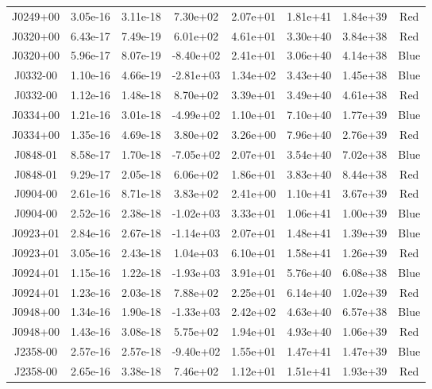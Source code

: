 \begin{table}
\begin{tabular}{cccccccc}
J0249+00 & 3.05e-16 & 3.11e-18 & 7.30e+02 & 2.07e+01 & 1.81e+41 & 1.84e+39 & Red \\
J0320+00 & 6.43e-17 & 7.49e-19 & 6.01e+02 & 4.61e+01 & 3.30e+40 & 3.84e+38 & Red \\
J0320+00 & 5.96e-17 & 8.07e-19 & -8.40e+02 & 2.41e+01 & 3.06e+40 & 4.14e+38 & Blue \\
J0332-00 & 1.10e-16 & 4.66e-19 & -2.81e+03 & 1.34e+02 & 3.43e+40 & 1.45e+38 & Blue \\
J0332-00 & 1.12e-16 & 1.48e-18 & 8.70e+02 & 3.39e+01 & 3.49e+40 & 4.61e+38 & Red \\
J0334+00 & 1.21e-16 & 3.01e-18 & -4.99e+02 & 1.10e+01 & 7.10e+40 & 1.77e+39 & Blue \\
J0334+00 & 1.35e-16 & 4.69e-18 & 3.80e+02 & 3.26e+00 & 7.96e+40 & 2.76e+39 & Red \\
J0848-01 & 8.58e-17 & 1.70e-18 & -7.05e+02 & 2.07e+01 & 3.54e+40 & 7.02e+38 & Blue \\
J0848-01 & 9.29e-17 & 2.05e-18 & 6.06e+02 & 1.86e+01 & 3.83e+40 & 8.44e+38 & Red \\
J0904-00 & 2.61e-16 & 8.71e-18 & 3.83e+02 & 2.41e+00 & 1.10e+41 & 3.67e+39 & Red \\
J0904-00 & 2.52e-16 & 2.38e-18 & -1.02e+03 & 3.33e+01 & 1.06e+41 & 1.00e+39 & Blue \\
J0923+01 & 2.84e-16 & 2.67e-18 & -1.14e+03 & 2.07e+01 & 1.48e+41 & 1.39e+39 & Blue \\
J0923+01 & 3.05e-16 & 2.43e-18 & 1.04e+03 & 6.10e+01 & 1.58e+41 & 1.26e+39 & Red \\
J0924+01 & 1.15e-16 & 1.22e-18 & -1.93e+03 & 3.91e+01 & 5.76e+40 & 6.08e+38 & Blue \\
J0924+01 & 1.23e-16 & 2.03e-18 & 7.88e+02 & 2.25e+01 & 6.14e+40 & 1.02e+39 & Red \\
J0948+00 & 1.34e-16 & 1.90e-18 & -1.33e+03 & 2.42e+02 & 4.63e+40 & 6.57e+38 & Blue \\
J0948+00 & 1.43e-16 & 3.08e-18 & 5.75e+02 & 1.94e+01 & 4.93e+40 & 1.06e+39 & Red \\
J2358-00 & 2.57e-16 & 2.57e-18 & -9.40e+02 & 1.55e+01 & 1.47e+41 & 1.47e+39 & Blue \\
J2358-00 & 2.65e-16 & 3.38e-18 & 7.46e+02 & 1.12e+01 & 1.51e+41 & 1.93e+39 & Red \\
\end{tabular}
\end{table}

